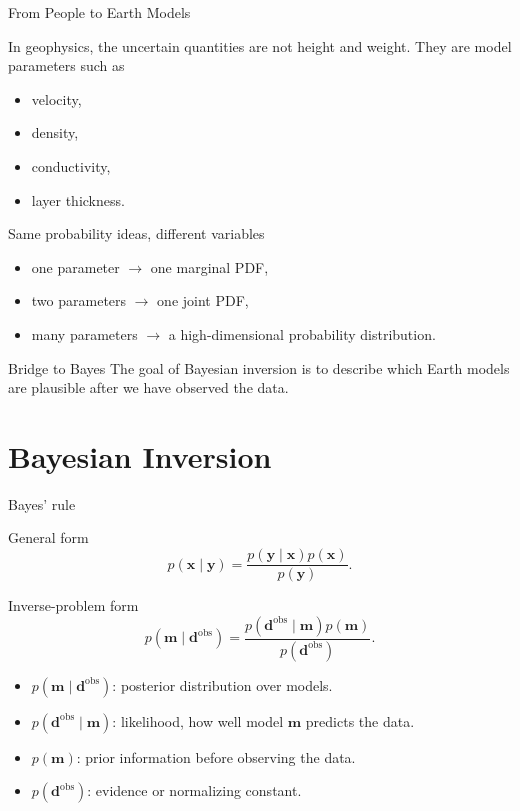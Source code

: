 \documentclass[aspectratio=169]{beamer}
\renewcommand{\vec}[1]{\mathbf{#1}}
\newcommand{\dobs}{{\vec{d}^{\text{obs}}}}
\newcommand{\mm}{ {\vec{m}} }
\begin{document}
\begin{frame}{From People to Earth Models}
\small

In geophysics, the uncertain quantities are not height and weight. They are model parameters such as

\begin{itemize}
    \item[--] velocity,
    \item[--] density,
    \item[--] conductivity,
    \item[--] layer thickness.
\end{itemize}

\begin{block}{Same probability ideas, different variables}
\begin{itemize}
    \item[--] one parameter $\rightarrow$ one marginal PDF,
    \item[--] two parameters $\rightarrow$ one joint PDF,
    \item[--] many parameters $\rightarrow$ a high-dimensional probability distribution.
\end{itemize}
\end{block}

\begin{alertblock}{Bridge to Bayes}
The goal of Bayesian inversion is to describe which Earth models are plausible after we have observed the data.
\end{alertblock}
\end{frame}

\section{Bayesian Inversion}

\begin{frame}{Bayes' rule}
\small

\begin{alertblock}{General form}
\[
p(\vec{x}\mid\vec{y})
=
\frac{p(\vec{y}\mid\vec{x})p(\vec{x})}{p(\vec{y})}.
\]
\end{alertblock}

\begin{block}{Inverse-problem form}
\[
p(\mm\mid\dobs)
=
\frac{p(\dobs\mid\mm)p(\mm)}{p(\dobs)}.
\]
\end{block}

\begin{itemize}
    \item[--] $p(\mm\mid\dobs)$: posterior distribution over models.
    \item[--] $p(\dobs\mid\mm)$: likelihood, how well model $\mm$ predicts the data.
    \item[--] $p(\mm)$: prior information before observing the data.
    \item[--] $p(\dobs)$: evidence or normalizing constant.
\end{itemize}
\end{frame}
\end{document}
